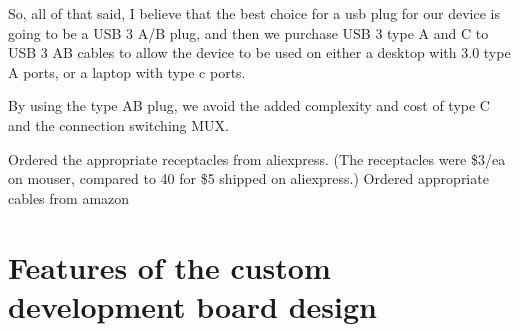 So, all of that said, I believe that the best choice for a usb plug for our device is going to be a USB 3 A/B plug, and then we purchase USB 3 type A and C to USB 3 AB cables to allow the device to be used on either a desktop with 3.0 type A ports, or a laptop with type c ports.

By using the type AB plug, we avoid the added complexity and cost of type C and the connection switching MUX.

Ordered the appropriate receptacles from aliexpress. (The receptacles were \$3/ea on mouser, compared to 40 for \$5 shipped on aliexpress.)
Ordered appropriate cables from amazon


\section{Features of the custom development board design}
